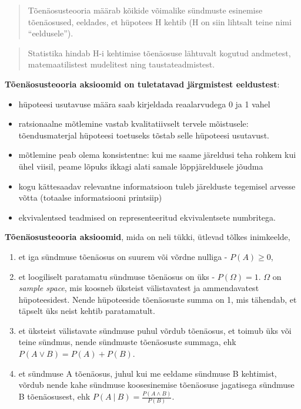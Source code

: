 \documentclass[]{book}
\begin{document}
\begin{quote}
Tõenäosusteooria määrab kõikide võimalike sündmuste esinemise
tõenäosused, eeldades, et hüpotees H kehtib (H on siin lihtsalt teine
nimi ``eeldusele'').
\end{quote}

\begin{quote}
Statistika hindab H-i kehtimise tõenäosuse lähtuvalt kogutud andmetest,
matemaatilistest mudelitest ning taustateadmistest.
\end{quote}

\textbf{Tõenäosusteooria aksioomid on tuletatavad järgmistest
eeldustest}:

\begin{itemize}
\item
  hüpoteesi usutavuse määra saab kirjeldada reaalarvudega 0 ja 1 vahel
\item
  ratsionaalne mõtlemine vastab kvalitatiivselt tervele mõistusele:
  tõendusmaterjal hüpoteesi toetuseks tõstab selle hüpoteesi usutavust.
\item
  mõtlemine peab olema konsistentne: kui me saame järeldusi teha rohkem
  kui ühel viisil, peame lõpuks ikkagi alati samale lõppjäreldusele
  jõudma
\item
  kogu kättesaadav relevantne informatsioon tuleb järelduste tegemisel
  arvesse võtta (totaalse informatsiooni printsiip)
\item
  ekvivalentsed teadmised on representeeritud ekvivalentsete numbritega.
\end{itemize}

\textbf{Tõenäosusteooria aksioomid}, mida on neli tükki, ütlevad tõlkes
inimkeelde,

\begin{enumerate}
\def\labelenumi{(\arabic{enumi})}
\item
  et iga sündmuse tõenäosus on suurem või võrdne nulliga -
  \(P(A) \geq 0\),
\item
  et loogiliselt paratamatu sündmuse tõenäosus on üks - \(P(\Omega)=1\).
  \(\Omega\) on \emph{sample space}, mis koosneb üksteist välistavatest
  ja ammendavatest hüpoteesidest. Nende hüpoteeside tõenäosuste summa on
  1, mis tähendab, et täpselt üks neist kehtib paratamatult.
\item
  et üksteist välistavate sündmuse puhul võrdub tõenäosus, et toimub üks
  või teine sündmus, nende sündmuste tõenäosuste summaga, ehk
  \(P(A \lor B) = P(A) + P(B)\).
\item
  et sündmuse A tõenäosus, juhul kui me eeldame sündmuse B kehtimist,
  võrdub nende kahe sündmuse koosesinemise tõenäosuse jagatisega
  sündmuse B tõenäosusest, ehk
  \(P(A~\vert~B) = \frac{P(A \land B)}{P(B)}\).
\end{enumerate}
\end{document}
